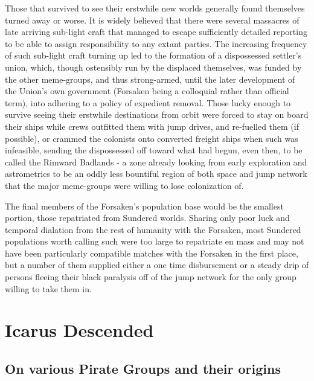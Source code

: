 Those that survived to see their erstwhile new worlds generally found
themselves turned away or worse. It is widely believed that there were
several massacres of late arriving sub-light craft that managed to
escape sufficiently detailed reporting to be able to assign
responsibility to any extant parties. The increasing frequency of such
sub-light craft turning up led to the formation of a dispossessed
settler's union, which, though ostensibly run by the displaced
themselves, was funded by the other meme-groups, and thus
strong-armed, until the later development of the Union's own
government (Forsaken being a colloquial rather than official term),
into adhering to a policy of expedient removal. Those lucky enough to
survive seeing their erstwhile destinations from orbit were forced to
stay on board their ships while crews outfitted them with jump drives,
and re-fuelled them (if possible), or crammed the colonists onto
converted freight ships when such was infeasible, sending the
dispossessed off toward what had begun, even then, to be called the
Rimward Badlands - a zone already looking from early exploration and
astrometrics to be an oddly less bountiful region of both space and
jump network that the major meme-groups were willing to lose
colonization of.

The final members of the Forsaken's population base would be the
smallest portion, those repatriated from Sundered worlds. Sharing only
poor luck and temporal dialation from the rest of humanity with the
Forsaken, most Sundered populations worth calling such were too large
to repatriate en mass and may not have been particularly compatible
matches with the Forsaken in the first place, but a number of them
supplied either a one time disbursement or a steady drip of persons
fleeing their black paralysis off of the jump network for the only
group willing to take them in.
 
\section{Icarus Descended}
\subsection{On various Pirate Groups and their origins }

